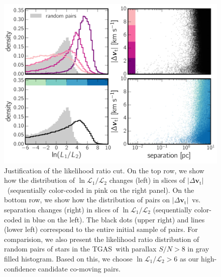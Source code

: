 \documentclass[manuscript, letterpaper]{aastex6}
\newcommand{\acronym}[1]{{\small{#1}}}
\newcommand{\tgas}{\acronym{TGAS}}
\newcommand{\bs}[1]{\boldsymbol{#1}}
\renewcommand{\vec}[1]{\bs{#1}}
\newcommand{\absdvtan}{\ensuremath{|\Delta\vec v_\mathrm{t}|}}
\begin{document}
\begin{figure}[htbp]
  \begin{center}
    \includegraphics[width=\textwidth]{figures/likelihoodratios.pdf}
  \end{center}
  \caption{%
    Justification of the likelihood ratio cut.
    On the top row, we show how the distribution of $\ln \mathcal{L}_1 /\mathcal{L}_2$
    changes (left) in slices of \absdvtan\ (sequentially color-coded in pink on the right panel).
    On the bottom row, we show how the distribution of pairs on \absdvtan\ vs. separation changes (right)
    in slices of $\ln \mathcal{L}_1 /\mathcal{L}_2$ (sequentially color-coded in blue on the left).
    The black dots (upper right) and lines (lower left) correspond to the entire initial sample of pairs.
    For comparision, we also present the likelihood ratio distribution of random pairs
    of stars in the \tgas\ with parallax $S/N>8$ in gray filled histogram.
    Based on this, we choose $\ln \mathcal{L}_1 /\mathcal{L}_2 > 6$ as our high-confidence
    candidate co-moving pairs.
    \label{fig:likelihoodratios}}
    \vspace{1em}
\end{figure}
\end{document}
